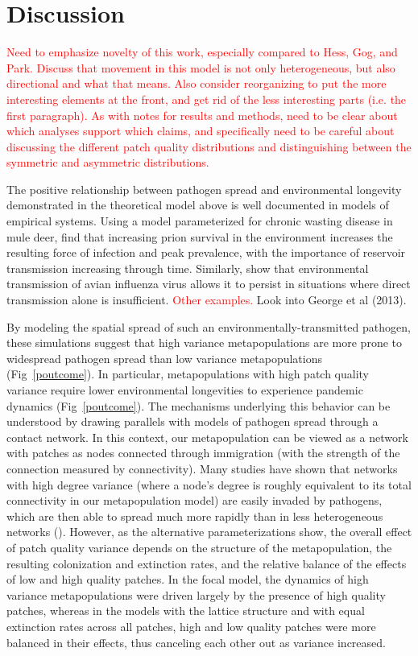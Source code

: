 \documentclass{svjour3}
\begin{document}
\section{Discussion}
\label{discussion} 

\textcolor{red}{Need to emphasize novelty of this work, especially compared to Hess, Gog, and Park.  Discuss that movement in this model is not only heterogeneous, but also directional and what that means.  Also consider reorganizing to put the more interesting elements at the front, and get rid of the less interesting parts (i.e. the first paragraph).  As with notes for results and methods, need to be clear about which analyses support which claims, and specifically need to be careful about discussing the different patch quality distributions and distinguishing between the symmetric and asymmetric distributions.}

The positive relationship between pathogen spread and environmental longevity demonstrated in the theoretical model above is well documented in models of empirical systems.  Using a model parameterized for chronic wasting disease in mule deer, \cite{Almberg2011} find that increasing prion survival in the environment increases the resulting force of infection and peak prevalence, with the importance of reservoir transmission increasing through time.  Similarly, \cite{Breban2009} show that environmental transmission of avian influenza virus allows it to persist in situations where direct transmission alone is insufficient.  \textcolor{red}{Other examples.}  Look into George et al (2013).

By modeling the spatial spread of such an environmentally-transmitted pathogen, these simulations suggest that high variance metapopulations are more prone to widespread pathogen spread than low variance metapopulations (Fig~\ref{poutcome}).  In particular, metapopulations with high patch quality variance require lower environmental longevities to experience pandemic dynamics (Fig~\ref{poutcome}).  The mechanisms underlying this behavior can be understood by drawing parallels with models of pathogen spread through a contact network.  In this context, our metapopulation can be viewed as a network with patches as nodes connected through immigration (with the strength of the connection measured by connectivity).  Many studies have shown that networks with high degree variance (where a node's degree is roughly equivalent to its total connectivity in our metapopulation model) are easily invaded by pathogens, which are then able to spread much more rapidly than in less heterogeneous networks (\cite{Pastor-Satorras2001}).  However, as the alternative parameterizations show, the overall effect of patch quality variance depends on the structure of the metapopulation, the resulting colonization and extinction rates, and the relative balance of the effects of low and high quality patches.  In the focal model, the dynamics of high variance metapopulations were driven largely by the presence of high quality patches, whereas in the models with the lattice structure and with equal extinction rates across all patches, high and low quality patches were more balanced in their effects, thus canceling each other out as variance increased.   
\end{document}
